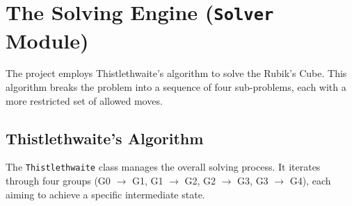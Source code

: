 \documentclass[11pt, a4paper]{article}
\begin{document}
\section{The Solving Engine (\texttt{Solver} Module)}
The project employs Thistlethwaite's algorithm to solve the Rubik's Cube. This algorithm breaks the problem into a sequence of four sub-problems, each with a more restricted set of allowed moves.

\subsection{Thistlethwaite's Algorithm}
The \texttt{Thistlethwaite} class manages the overall solving process. It iterates through four groups (G0 $\rightarrow$ G1, G1 $\rightarrow$ G2, G2 $\rightarrow$ G3, G3 $\rightarrow$ G4), each aiming to achieve a specific intermediate state.
\end{document}
